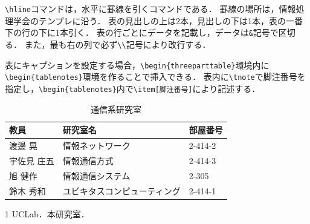\documentclass[uplatex]{jsarticle}
\begin{document}
\verb|\hline|コマンドは，水平に罫線を引くコマンドである．
罫線の場所は，情報処理学会のテンプレに沿う．
表の見出しの上は2本，見出しの下は1本，表の一番下の行の下に1本引く．
表の行ごとにデータを記載し，データは\verb|&|記号で区切る．
また，最も右の列で必ず\verb|\\|記号により改行する．

表にキャプションを設定する場合，\verb|\begin{threeparttable}|環境内に\verb|\begin{tablenotes}|環境を作ることで挿入できる．
表内に\verb|\tnote|で脚注番号を指定し，\verb|\begin{tablenotes}|内で\verb|\item[脚注番号]|により記述する．

\begin{table}[ht]
 \centering
 \caption{通信系研究室}
 \label{tab:NetworkLab}
 \small	%
 \begin{threeparttable}	%
  \begin{tabular}{lll}
  \hline\hline
  教員 & 研究室名 & 部屋番号 \\
  \hline
  渡邊 晃 & 情報ネットワーク & 2-414-2 \\
  宇佐見 庄五 & 情報通信方式 & 2-414-3 \\
  旭 健作 & 情報通信システム & 2-305 \\
  鈴木 秀和 & ユビキタスコンピューティング \tnote{1} & 2-414-1 \\
  \hline
  \end{tabular} 
  \begin{tablenotes}\footnotesize  %
  \item[1] UCLab．本研究室．
  \end{tablenotes}
 \end{threeparttable}
\end{table}
\end{document}
